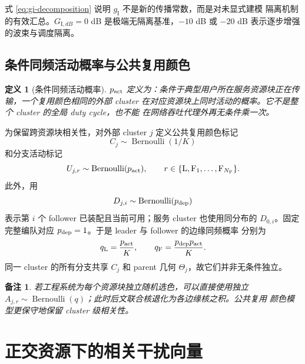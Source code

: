 \documentclass[UTF8,a4paper,11pt]{ctexart}
\newtheorem{definition}{定义}[section]
\newtheorem{remark}{备注}[section]
\newcommand{\NF}{N_{\mathrm F}}
\begin{document}
式 \eqref{eq:gi-decomposition} 说明 $g_{\mathrm I}$ 不是新的传播常数，而是对未显式建模
隔离机制的有效汇总。$G_{\mathrm I,dB}=0$ dB 是极端无隔离基准，$-10$ dB 或 $-20$ dB
表示逐步增强的波束与调度隔离。

\subsection{条件同频活动概率与公共复用颜色}

\begin{definition}[条件同频活动概率]
$p_{\rm act}$ 定义为：条件于典型用户所在服务资源块正在传输，一个复用颜色相同的外部
cluster 在对应资源块上同时活动的概率。它不是整个 cluster 的全局 duty cycle，也不能
在网络吞吐代理外再无条件乘一次。
\end{definition}

为保留跨资源块相关性，对外部 cluster $j$ 定义公共复用颜色标记
\begin{equation}
 C_j\sim\operatorname{Bernoulli}(1/K)
 \label{eq:reuse-mark}
\end{equation}
和分支活动标记
\begin{equation}
 U_{j,r}\sim\operatorname{Bernoulli}(p_{\rm act}),
 \qquad r\in\{\mathrm L,\mathrm F_1,\ldots,\mathrm F_{\NF}\}.
 \label{eq:activity-mark}
\end{equation}
此外，用
\begin{equation}
 D_{j,i}\sim\operatorname{Bernoulli}(p_{\rm dep})
 \label{eq:deployment-mark}
\end{equation}
表示第 $i$ 个 follower 已装配且当前可用；服务 cluster 也使用同分布的
$D_{0,i}$。固定完整编队对应 $p_{\rm dep}=1$。于是 leader 与 follower 的边缘同频概率
分别为
\begin{equation}
 q_{\rm L}=\frac{p_{\rm act}}{K},
 \qquad
 q_{\rm F}=\frac{p_{\rm dep}p_{\rm act}}{K}.
 \label{eq:q}
\end{equation}
同一 cluster 的所有分支共享 $C_j$ 和 parent 几何 $\Theta_j$，故它们并非无条件独立。

\begin{remark}
若工程系统为每个资源块独立随机选色，可以直接使用独立
$A_{j,r}\sim\operatorname{Bernoulli}(q)$；此时后文联合核退化为各边缘核之积。公共复用
颜色模型更保守地保留 cluster 级相关性。
\end{remark}

\section{正交资源下的相关干扰向量}
\end{document}
